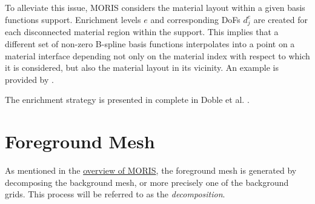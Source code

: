 To alleviate this issue, MORIS considers the material layout within a given basis functions support. Enrichment levels $e$ and corresponding DoFs $d_{j}^{e}$ are created for each disconnected material region within the support. This implies that a different set of non-zero B-spline basis functions interpolates into a point on a material interface depending not only on the material index with respect to which it is considered, but also the material layout in its vicinity. An example is provided by .

The enrichment strategy is presented in complete in Doble et al. \cite{Doble2023}.

\section{Foreground Mesh}
\label{sec:overview_foreground}

As mentioned in the \hyperlink{moris_overview}{overview of MORIS}, the foreground mesh is generated by decomposing the background mesh, or more precisely one of the background grids. This process will be referred to as the \emph{decomposition}.

